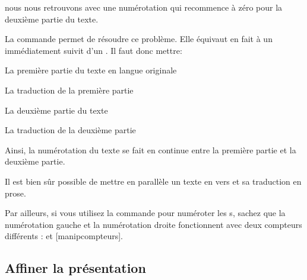 nous nous retrouvons avec une numérotation qui recommence à zéro pour la deuxième partie du texte. 

La commande  permet de résoudre ce problème. Elle équivaut en fait à un  immédiatement suivit d'un . Il faut donc mettre: 

\begin{latexcode}
\begin{pages}  
\begin{Leftside}  \beginnumbering 
La première partie du texte en langue originale
\end{Leftside} %
 
\begin{Rightside} \beginnumbering
La traduction de la première partie
\end{Rightside} %
\Pages
 
\begin{Leftside} \memorydump %
La deuxième partie du texte 
\endnumbering  \end{Leftside}
    
\begin{Rightside}  \memorydump %
La traduction de la deuxième partie
\endnumbering \end{Rightside}   %
 
 \Pages

\end{pages}
\end{latexcode}

Ainsi, la numérotation du texte se fait en continue entre la première partie et la deuxième partie.


\begin{plusloins}
Il est bien sûr possible de mettre en parallèle un texte en vers et sa traduction en prose. 

Par ailleurs, si vous utilisez la commande  pour numéroter les s, sachez que la numérotation gauche et la numérotation droite fonctionnent avec deux compteurs différents :  et [manipcompteurs].
\end{plusloins}




\subsection{Affiner la présentation}


